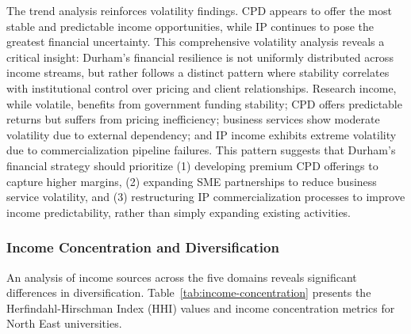\documentclass[journal,onecolumn, 10pt,draftclsnofoot]{IEEEtran}
\begin{document}
The trend analysis reinforces volatility findings. CPD appears to offer the most stable and predictable income opportunities, while IP continues to pose the greatest financial uncertainty. This comprehensive volatility analysis reveals a critical insight: Durham's financial resilience is not uniformly distributed across income streams, but rather follows a distinct pattern where stability correlates with institutional control over pricing and client relationships. Research income, while volatile, benefits from government funding stability; CPD offers predictable returns but suffers from pricing inefficiency; business services show moderate volatility due to external dependency; and IP income exhibits extreme volatility due to commercialization pipeline failures. This pattern suggests that Durham's financial strategy should prioritize (1) developing premium CPD offerings to capture higher margins, (2) expanding SME partnerships to reduce business service volatility, and (3) restructuring IP commercialization processes to improve income predictability, rather than simply expanding existing activities.

\subsubsection{Income Concentration and Diversification}

An analysis of income sources across the five domains reveals significant differences in diversification. Table~\ref{tab:income-concentration} presents the Herfindahl-Hirschman Index (HHI) values and income concentration metrics for North East universities.

\begin{table}[h]
\centering
\caption{Income Concentration Analysis - North East Universities}
\vspace{0.1cm}
\label{tab:income-concentration}
\end{table}
\end{document}

